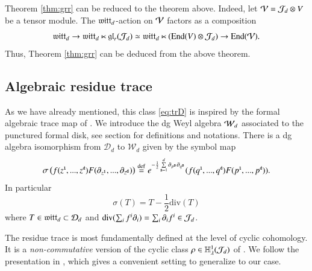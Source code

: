 \documentclass[main.tex]{subfiles}
\begin{document}
Theorem \ref{thm:grr} can be reduced to the theorem above. 
Indeed, let $\mathcal V= \mathcal J_d \otimes V$ be a tensor module. 
The $\mathfrak{witt}_d$-action on $\mathcal V$ factors as a composition
\[
\mathfrak{witt}_d \to \mathfrak{witt}_d \ltimes \mathfrak{gl}_r(\mathcal J_d)\simeq \mathfrak{witt}_d \ltimes (\operatorname{End}(V)\otimes \mathcal J_d)\to \operatorname{End}(\mathcal V).
\]
Thus, Theorem \ref{thm:grr} can be deduced from the above theorem.

\subsection{Algebraic residue trace}
As we have already mentioned, this class \eqref{eq:trD} is inspired by the formal algebraic trace map of \cite{FFS}.
We introduce the dg Weyl algebra $\mathcal W_d$ associated to the punctured formal disk, see section \cite[section 1.5]{GWvir2d} for definitions and
notations.
There is a dg algebra isomorphism from $\mathcal{D}_{d}$ to $\mathcal{W}_{d}$ given by the symbol map
\[
\sigma\left(f(z^{{\textbf{\texttt{\tiny{1}}}}},...,z^{\textbf{\texttt{\tiny{d}}}})F(\partial_{z^{{\textbf{\texttt{\tiny{1}}}}}},...,\partial_{z^{\textbf{\texttt{\tiny{d}}}}})\right) \overset{\rm def}{=} e^{-\frac{1}{2}\sum^d\limits_{\textbf{\texttt{\tiny{s}}}=1}\partial_{p^{\textbf{\texttt{\tiny{s}}}}}\partial_{q^{\textbf{\texttt{\tiny{s}}}}}}(f(q^{{\textbf{\texttt{\tiny{1}}}}},...,q^{\textbf{\texttt{\tiny{d}}}})F(p^{{\textbf{\texttt{\tiny{1}}}}},...,p^{\textbf{\texttt{\tiny{d}}}})).
\]
In particular
\[
\sigma\left(T\right)=T-\frac{1}{2}\mathrm{div}(T)
\]
where $T\in \mathfrak{witt}_d \subset \mathcal D_d$ and $\operatorname{div}(\sum_i f^i \partial_i) = \sum_i \partial_i f^i \in \mathcal J_d$.

The residue trace is most fundamentally defined at the level of cyclic cohomology.
It is a \textit{non-commutative} version of the cyclic class $\rho \in \mathbb H_\lambda^1(\mathcal J_d)$ of \cite{FHK}. We follow the presentation in \cite[3]{GLX}, which gives a convenient setting to generalize \cite{FFS} to our case.
\end{document}
